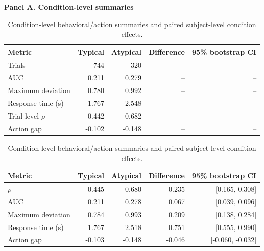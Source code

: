 \begin{table}[htbp]
\centering
\caption{Condition-level behavioral/action summaries and paired subject-level condition effects.}
\label{tab:condition-effects}
\small
\textbf{Panel A. Condition-level summaries}\\[0.25em]
\begin{tabular*}{\linewidth}{@{\extracolsep{\fill}}lrrrr@{}}
\toprule
Metric & Typical & Atypical & Difference & 95\% bootstrap CI \\
\midrule
Trials & 744 & 320 & -- & -- \\
AUC & 0.211 & 0.279 & -- & -- \\
Maximum deviation & 0.780 & 0.992 & -- & -- \\
Response time (s) & 1.767 & 2.548 & -- & -- \\
Trial-level $\rho$ & 0.442 & 0.682 & -- & -- \\
Action gap & -0.102 & -0.148 & -- & -- \\
\bottomrule
\end{tabular*}
\par\vspace{1.6em}
\noindent{}
\par\vspace{0.2em}
\begin{tabular*}{\linewidth}{@{\extracolsep{\fill}}lrrrr@{}}
\toprule
Metric & Typical & Atypical & Difference & 95\% bootstrap CI \\
\midrule
$\rho$ & 0.445 & 0.680 & 0.235 & [0.165, 0.308] \\
AUC & 0.211 & 0.278 & 0.067 & [0.039, 0.096] \\
Maximum deviation & 0.784 & 0.993 & 0.209 & [0.138, 0.284] \\
Response time (s) & 1.767 & 2.518 & 0.751 & [0.555, 0.990] \\
Action gap & -0.103 & -0.148 & -0.046 & [-0.060, -0.032] \\
\bottomrule
\end{tabular*}
\end{table}
